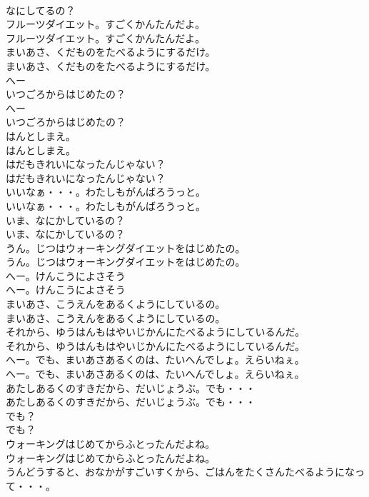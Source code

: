 \documentclass[8pt]{extreport}
\begin{document}
\begin{CJK}{UTF8}{min}
\\	なにしてるの？
\\	フルーツダイエット。すごくかんたんだよ。
\\	フルーツダイエット。すごくかんたんだよ。
\\	まいあさ、くだものをたべるようにするだけ。
\\	まいあさ、くだものをたべるようにするだけ。
\\	へー
\\	いつごろからはじめたの？
\\	へー
\\	いつごろからはじめたの？
\\	はんとしまえ。
\\	はんとしまえ。
\\	はだもきれいになったんじゃない？
\\	はだもきれいになったんじゃない？
\\	いいなぁ・・・。わたしもがんばろうっと。
\\	いいなぁ・・・。わたしもがんばろうっと。
\\	いま、なにかしているの？
\\	いま、なにかしているの？
\\	うん。じつはウォーキングダイエットをはじめたの。
\\	うん。じつはウォーキングダイエットをはじめたの。
\\	へー。けんこうによさそう
\\	へー。けんこうによさそう
\\	まいあさ、こうえんをあるくようにしているの。
\\	まいあさ、こうえんをあるくようにしているの。
\\	それから、ゆうはんもはやいじかんにたべるようにしているんだ。
\\	それから、ゆうはんもはやいじかんにたべるようにしているんだ。
\\	へー。でも、まいあさあるくのは、たいへんでしょ。えらいねぇ。
\\	へー。でも、まいあさあるくのは、たいへんでしょ。えらいねぇ。
\\	あたしあるくのすきだから、だいじょうぶ。でも・・・
\\	あたしあるくのすきだから、だいじょうぶ。でも・・・
\\	でも？
\\	でも？
\\	ウォーキングはじめてからふとったんだよね。
\\	ウォーキングはじめてからふとったんだよね。
\\	うんどうすると、おなかがすごいすくから、ごはんをたくさんたべるようになって・・・。

\end{CJK}
\end{document}
